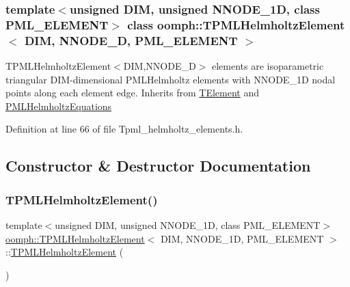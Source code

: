 \subsubsection*{template$<$unsigned D\+IM, unsigned N\+N\+O\+D\+E\+\_\+1D, class P\+M\+L\+\_\+\+E\+L\+E\+M\+E\+NT$>$\newline
class oomph\+::\+T\+P\+M\+L\+Helmholtz\+Element$<$ D\+I\+M, N\+N\+O\+D\+E\+\_\+D, P\+M\+L\+\_\+\+E\+L\+E\+M\+E\+N\+T $>$}

T\+P\+M\+L\+Helmholtz\+Element$<$\+D\+I\+M,\+N\+N\+O\+D\+E\+\_\+D$>$ elements are isoparametric triangular D\+I\+M-\/dimensional P\+M\+L\+Helmholtz elements with N\+N\+O\+D\+E\+\_\+1D nodal points along each element edge. Inherits from \hyperlink{classoomph_1_1TElement}{T\+Element} and \hyperlink{classoomph_1_1PMLHelmholtzEquations}{P\+M\+L\+Helmholtz\+Equations} 

Definition at line 66 of file Tpml\+\_\+helmholtz\+\_\+elements.\+h.



\subsection{Constructor \& Destructor Documentation}
\mbox{\label{classoomph_1_1TPMLHelmholtzElement_ada189053695a482366ab20995d5f8e6c}} 
\subsubsection{\texorpdfstring{T\+P\+M\+L\+Helmholtz\+Element()}{TPMLHelmholtzElement()}\hspace{0.1cm}{\footnotesize\ttfamily [1/2]}}
{\footnotesize\ttfamily template$<$unsigned D\+IM, unsigned N\+N\+O\+D\+E\+\_\+1D, class P\+M\+L\+\_\+\+E\+L\+E\+M\+E\+NT$>$ \\
\hyperlink{classoomph_1_1TPMLHelmholtzElement}{oomph\+::\+T\+P\+M\+L\+Helmholtz\+Element}$<$ D\+IM, N\+N\+O\+D\+E\+\_\+1D, P\+M\+L\+\_\+\+E\+L\+E\+M\+E\+NT $>$\+::\hyperlink{classoomph_1_1TPMLHelmholtzElement}{T\+P\+M\+L\+Helmholtz\+Element} (\begin{DoxyParamCaption}{ }\end{DoxyParamCaption})\hspace{0.3cm}{\ttfamily [inline]}}



